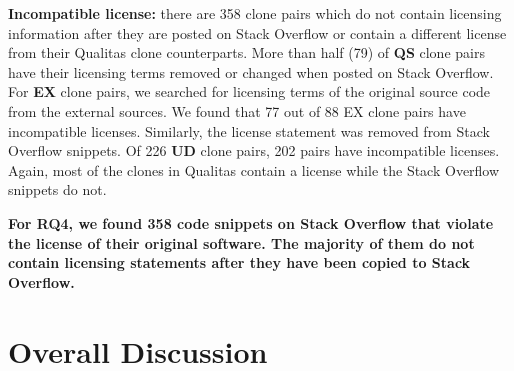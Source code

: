 \documentclass[sigconf,review, anonymous]{acmart}
\begin{document}
\textbf{Incompatible license:} there are 358 clone pairs which do not
contain licensing information after they are posted on Stack Overflow
or contain a different license from their Qualitas clone
counterparts. More than half (79) of \textbf{QS} clone pairs have
their licensing terms removed or changed when posted on Stack
Overflow. For \textbf{EX} clone pairs, we searched for licensing terms of the
original source code from the external sources. We found that 77 out
of 88 EX clone pairs have incompatible licenses.
Similarly, the license statement was removed from Stack Overflow
snippets. Of 226 \textbf{UD} clone pairs, 202 pairs have incompatible
licenses. Again, most of the clones in Qualitas contain a license
while the Stack Overflow snippets do not.
%

\textbf{For RQ4, we found 358 code snippets on Stack Overflow that
  violate the license of their original software. The majority of them
  do not contain licensing statements after they have been copied to
  Stack Overflow.}

\section{Overall Discussion}
\end{document}
